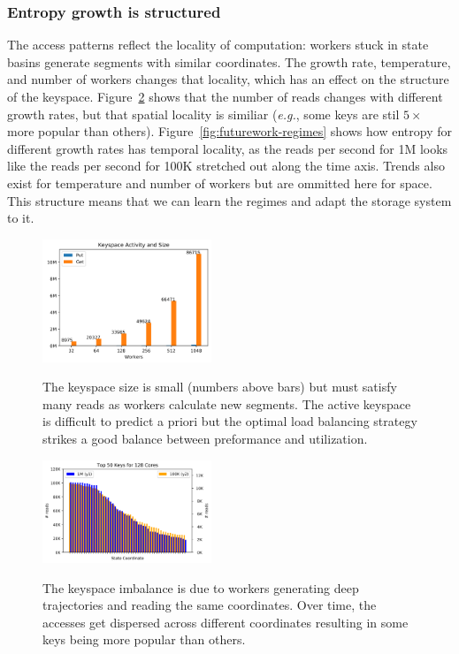 \subsubsection*{Entropy growth is structured} The access patterns reflect the
locality of computation: workers stuck in state basins generate segments with
similar coordinates. The growth rate, temperature, and number of workers
changes that locality, which has an effect on the structure of the keyspace.
Figure~\ref{fig:methodology-keys} shows that the number of reads changes with
different growth rates, but that spatial locality is similiar ({\it e.g.}, some
keys are stil \(5\times\) more popular than others).
Figure~\ref{fig:futurework-regimes} shows how entropy for different growth
rates has temporal locality, as the reads per second for 1M looks like the
reads per second for 100K stretched out along the time axis.  Trends also exist
for temperature and number of workers but are ommitted here for space. This
structure means that we can learn the regimes and adapt the storage system to
it. 

\begin{figure}[tbh]
  \noindent\includegraphics[width=0.45\textwidth]{figures/methodology-keyspace.png}\\
  \caption{The keyspace size is small (numbers above bars) but must
  satisfy many reads as workers calculate new segments. The active keyspace is
  difficult to predict a priori but the optimal load balancing strategy strikes a
  good balance between preformance and utilization. 
  \label{fig:methodology-keyspace}}
\end{figure}

\begin{figure}[tbh]
  \noindent\includegraphics[width=0.45\textwidth]{figures/methodology-keys.png}\\
  \caption{The keyspace imbalance is due to workers generating deep
  trajectories and reading the same coordinates. Over time, the accesses get
  dispersed across different coordinates resulting in some keys being more
  popular than others.\label{fig:methodology-keys}}
\end{figure}

